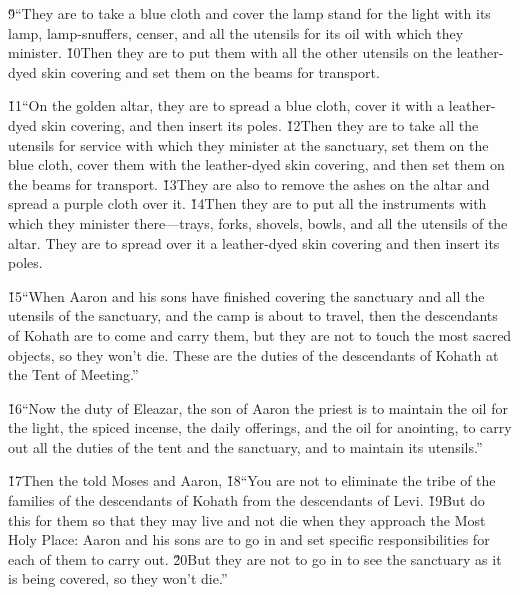 \v{9}``They are to take a blue cloth and cover the lamp stand for the light with its lamp, lamp-snuffers, censer, and all the utensils for its oil with which they minister. \v{10}Then they are to put them with all the other utensils on the leather-dyed skin covering and set them on the beams for transport.

\v{11}``On the golden altar, they are to spread a blue cloth, cover it with a leather-dyed skin covering, and then insert its poles. \v{12}Then they are to take all the utensils for service with which they minister at the sanctuary, set them on the blue cloth, cover them with the leather-dyed skin covering, and then set them on the beams for transport. \v{13}They are also to remove the ashes on the altar and spread a purple cloth over it. \v{14}Then they are to put all the instruments with which they minister there---trays, forks, shovels, bowls, and all the utensils of the altar. They are to spread over it a leather-dyed skin covering and then insert its poles.

\v{15}``When Aaron and his sons have finished covering the sanctuary and all the utensils of the sanctuary, and the camp is about to travel, then the descendants of Kohath are to come and carry them, but they are not to touch the most sacred objects, so they won't die. These are the duties of the descendants of Kohath at the Tent of Meeting.''

\v{16}``Now the duty of Eleazar, the son of Aaron the priest is to maintain the oil for the light, the spiced incense, the daily offerings, and the oil for anointing, to carry out all the duties of the tent and the sanctuary, and to maintain its utensils.''


\v{17}Then the  told Moses and Aaron, \v{18}``You are not to eliminate the tribe of the families of the descendants of Kohath from the descendants of Levi. \v{19}But do this for them so that they may live and not die when they approach the Most Holy Place: Aaron and his sons are to go in and set specific responsibilities for each of them to carry out. \v{20}But they are not to go in to see the sanctuary as it is being covered, so they won't die.''

